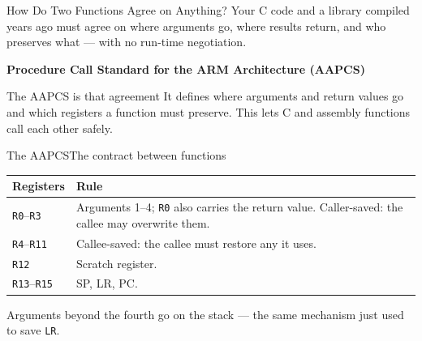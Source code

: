 \documentclass[9pt,aspectratio=169,xcolor=table]{beamer}
\newcommand{\striped}{\rowcolors{1}{white}{stripe}}
\begin{document}
\begin{frame}{How Do Two Functions Agree on Anything?}
    \leavevmode
{\small
	Your C code and a library compiled years ago must agree on where
	arguments go, where results return, and who preserves what ---
	with no run-time negotiation.}

    \vspace{3mm}
    \begin{center}
    \end{center}

\vspace{2mm} \textbf{\small Procedure Call Standard for the ARM Architecture (AAPCS)} \vspace{1mm} \begin{block}{The AAPCS is that agreement} It defines where arguments and return values go and which registers a function must preserve. This lets C and assembly functions call each other safely. \end{block}
\end{frame}

\begin{frame}{The AAPCS}{The contract between functions}
    \begin{center}
    {\small
    \striped
    \begin{tabular}{@{}l R{.62\textwidth}@{}}
\toprule
\textbf{Registers} & \textbf{Rule} \\
\midrule
\texttt{R0}--\texttt{R3}
& Arguments 1--4; \texttt{R0} also carries the return value. \alert{Caller-saved}: the callee may overwrite them. \\[1mm]
\texttt{R4}--\texttt{R11}
& \phantom{}\alert{Callee-saved}: the callee must restore any it uses. \\
\texttt{R12}
& Scratch register. \\
\texttt{R13}--\texttt{R15}
& SP, LR, PC. \\
\bottomrule
    \end{tabular}}
    \end{center}

    \vspace{3mm}
    {\small Arguments beyond the fourth go on the \alert{stack} ---
    the same mechanism just used to save \texttt{LR}.}
\end{frame}
\end{document}
